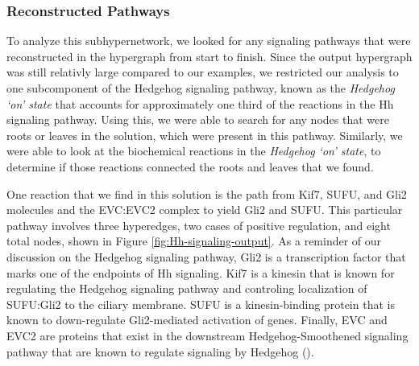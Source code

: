 \documentclass[12pt,twoside]{reedthesis}
\theoremstyle{definition}
\begin{document}
   \subsubsection{Reconstructed Pathways}

   To analyze this subhypernetwork, we looked for any signaling pathways that were reconstructed in the hypergraph from start to finish. Since the output hypergraph was still relativly large compared to our examples, we restricted our analysis to one subcomponent of the Hedgehog signaling pathway, known as the \textit{Hedgehog `on' state} that accounts for approximately one third of the reactions in the Hh signaling pathway. Using this, we were able to search for any nodes that were roots or leaves in the solution, which were present in this pathway. Similarly, we were able to look at the biochemical reactions in the \textit{Hedgehog `on' state}, to determine if those reactions connected the roots and leaves that we found.\par

   One reaction that we find in this solution is the path from Kif7, SUFU, and Gli2 molecules and the EVC:EVC2 complex to yield Gli2 and SUFU. This particular pathway involves three hyperedges, two cases of positive regulation, and eight total nodes, shown in Figure \ref{fig:Hh-signaling-output}. As a reminder of our discussion on the Hedgehog signaling pathway, Gli2 is a transcription factor that marks one of the endpoints of Hh signaling. Kif7 is a kinesin that is known for regulating the Hedgehog signaling pathway and controling localization of SUFU:Gli2 to the ciliary membrane. SUFU is a kinesin-binding protein that is known to down-regulate Gli2-mediated activation of genes. Finally, EVC and EVC2 are proteins that exist in the downstream Hedgehog-Smoothened signaling pathway that are known to regulate signaling by Hedgehog (\cite{TheUniProtConsortium2014}).\par
\end{document}
